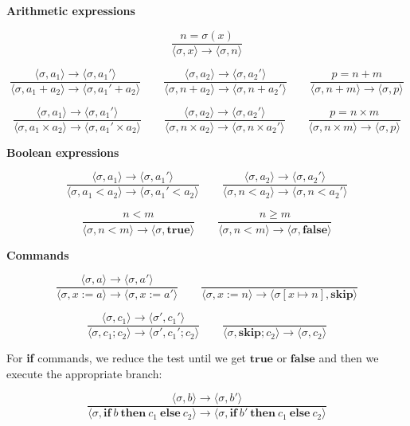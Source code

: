 \medskip
\noindent\textbf{Arithmetic expressions}

\[
\frac{n = \sigma(x)}{\langle \sigma, x \rangle \to \langle \sigma, n \rangle}
\]

\[
\frac{\langle \sigma, a_1 \rangle \to \langle \sigma, a_1' \rangle}{\langle \sigma, a_1 + a_2
\rangle \to \langle \sigma, a_1' + a_2 \rangle}
\qquad
\frac{\langle \sigma, a_2 \rangle \to \langle \sigma, a_2' \rangle}{\langle \sigma, n + a_2
\rangle \to \langle \sigma, n + a_2' \rangle}
\qquad
\frac{p = n + m}{\langle \sigma, n + m \rangle \to \langle \sigma, p \rangle}
\]

\[
\frac{\langle \sigma, a_1 \rangle \to \langle \sigma, a_1' \rangle}{\langle \sigma, a_1 \times
a_2 \rangle \to \langle \sigma, a_1' \times a_2 \rangle}
\qquad
\frac{\langle \sigma, a_2 \rangle \to \langle \sigma, a_2' \rangle}{\langle \sigma, n \times a_2
\rangle \to \langle \sigma, n \times a_2' \rangle}
\qquad
\frac{p = n \times m}{\langle \sigma, n \times m \rangle \to \langle \sigma, p \rangle}
\]

\medskip
\noindent\textbf{Boolean expressions}

\[
\frac{\langle \sigma, a_1 \rangle \to \langle \sigma, a_1' \rangle}{\langle \sigma, a_1 < a_2
\rangle \to \langle \sigma, a_1' < a_2 \rangle}
\qquad
\frac{\langle \sigma, a_2 \rangle \to \langle \sigma, a_2' \rangle}{\langle \sigma, n < a_2
\rangle \to \langle \sigma, n < a_2' \rangle}
\]

\[
\frac{n < m}{\langle \sigma, n < m \rangle \to \langle \sigma, \mathbf{true} \rangle}
\qquad
\frac{n \geq m}{\langle \sigma, n < m \rangle \to \langle \sigma, \mathbf{false} \rangle}
\]

\medskip
\noindent\textbf{Commands}

\[
\frac{\langle \sigma, a \rangle \to \langle \sigma, a' \rangle}{\langle \sigma, x := a \rangle
\to \langle \sigma, x := a' \rangle}
\qquad
\frac{}{\langle \sigma, x := n \rangle \to \langle \sigma[x \mapsto n], \mathbf{skip} \rangle}
\]

\[
\frac{\langle \sigma, c_1 \rangle \to \langle \sigma', c_1' \rangle}{\langle \sigma, c_1; c_2
\rangle \to \langle \sigma', c_1'; c_2 \rangle}
\qquad
\frac{}{\langle \sigma, \mathbf{skip}; c_2 \rangle \to \langle \sigma, c_2 \rangle}
\]

For \textbf{if} commands, we reduce the test until we get $\mathbf{true}$ or $\mathbf{false}$
and then we execute the appropriate branch:

\[
\frac{\langle \sigma, b \rangle \to \langle \sigma, b' \rangle}{\langle \sigma, \mathbf{if}\ b\
\mathbf{then}\ c_1\ \mathbf{else}\ c_2 \rangle \to \langle \sigma, \mathbf{if}\ b'\
\mathbf{then}\ c_1\ \mathbf{else}\ c_2 \rangle}
\]


